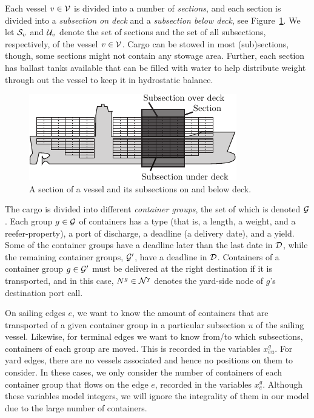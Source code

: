 Each vessel $v\in\mathcal{V}$ is divided into a number of \emph{sections}, and each section is divided into a \emph{subsection on deck} and a \emph{subsection below deck}, see Figure~\ref{fig:vessel}. We let $\mathcal{S}_v$ and $\mathcal{U}_v$ denote the set of sections and the set of all subsections, respectively, of the vessel $v\in \mathcal{V}$.
Cargo can be stowed in most (sub)sections, though, some sections might not contain any stowage area. Further, each section has ballast tanks available that can be filled with water to help distribute weight through out the vessel to keep it in hydrostatic balance.

\begin{figure}[pos=htbp]
	\centering
		\includegraphics[scale = 1.2]{figures/vessel2.pdf}
		\caption{A section of a vessel and its subsections on and below deck.}  \label{fig:vessel}
\end{figure}

The cargo is divided into different \emph{container groups}, the set of which is denoted $\mathcal{G}$. Each group $g\in \mathcal{G}$ of containers has a type (that is, a length, a weight, and a reefer-property), a port of discharge, a deadline (a delivery date), and a yield. Some of the container groups have a deadline later than the last date in $\mathcal{D}$, while the remaining container groups, $\mathcal{G}'$, have a deadline in $\mathcal{D}$. Containers of a container group $g\in\mathcal{G}'$ must be delivered at the right destination if it is transported, and in this case, $N^g \in \mathcal{N}^\texttt{y}$ denotes the yard-side node of $g$'s destination port call.  

On sailing edges $e$, we want to know the amount of containers that are transported of a given container group in a particular subsection $u$ of the sailing vessel. Likewise, for terminal edges we want to know from/to which subsections, containers of each group are moved. This is recorded in the variables $x^g_{eu}$. For yard edges, there are no vessels associated and hence no positions on them to consider. In these cases, we only consider the number of containers of each container group that flows on the edge $e$, recorded in the variables $x^g_e$. Although these variables model integers,  we will ignore the integrality of them in our model due to the large number of containers.

